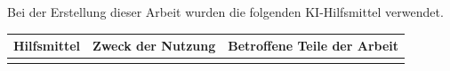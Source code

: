 \label{chap:ki-hilfsmittel}

Bei der Erstellung dieser Arbeit wurden die folgenden KI-Hilfsmittel verwendet.

\begin{center}
  \begin{tabularx}{\linewidth}{|X|X|X|}
    \hline
    \textbf{Hilfsmittel} & \textbf{Zweck der Nutzung} & \textbf{Betroffene Teile der Arbeit} \\
    \hline
                         &                            &                                      \\
    \hline
  \end{tabularx}
\end{center}
